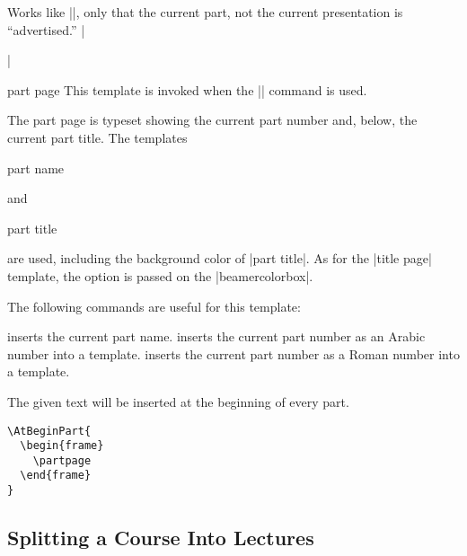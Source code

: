 \begin{command}{\partpage}
  Works like |\titlepage|, only that the current part, not the current presentation is ``advertised.''
  \example
  |\begin{frame}\partpage\end{frame}|

  \begin{element}{part page}\yes\no\no
    This template is invoked when the |\partpage| command is used.

    \begin{templateoptions}
      The part page is typeset showing the current part number and, below, the current part title. The templates
      \begin{element}{part name}\no\yes\yes
      \end{element}
      and
      \begin{element}{part title}\no\yes\yes
      \end{element}
      are used, including the background color of |part title|. As for the |title page| template, the  option is passed on the |beamercolorbox|.
    \end{templateoptions}

    The following commands are useful for this template:
    \begin{templateinserts}
      \iteminsert{\insertpart}
      inserts the current part name.
      \iteminsert{\insertpartnumber}
      inserts the current part number as an Arabic number into a template.
      \iteminsert{\insertromanpartnumber}
      inserts the current part number as a Roman number into a template.
    \end{templateinserts}
  \end{element}
\end{command}

\begin{command}{\AtBeginPart{}}
  The given text will be inserted at the beginning of every part.

  \example
\begin{verbatim}
\AtBeginPart{
  \begin{frame}
    \partpage
  \end{frame}
}
\end{verbatim}
\end{command}


\subsection{Splitting a Course Into Lectures}

